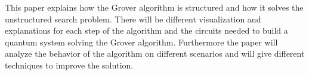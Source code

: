This paper explains how the Grover algorithm is structured and how it solves the unstructured search problem. There will be different visualization and explanations for each step of the algorithm and the circuits needed to build a quantum system solving the Grover algorithm. Furthermore the paper will analyze the behavior of the algorithm on different scenarios and will give different techniques to improve the solution.